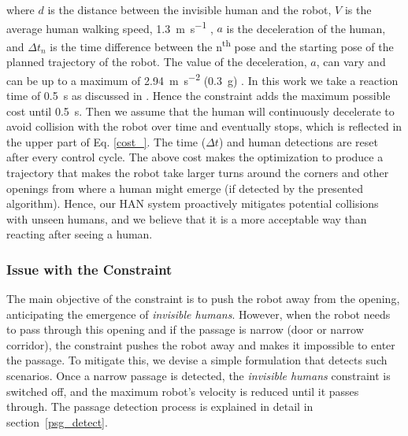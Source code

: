 where $d$ is the distance between the invisible human and the robot, $V$ is the average human walking speed, \SI[per-mode=symbol]{1.3}{\meter\per\second} \cite{phdthesis}, $a$ is the deceleration of the human, and $\Delta t_n$ is the time difference between the n\textsuperscript{th} pose and the starting pose of the planned trajectory of the robot. The value of the deceleration, $a$, can vary and can be up to a maximum of \SI{2.94}{\meter\per\second^2} (\SI{0.3}{\g}) \cite{lakoba2005modifications}. In this work we take a reaction time of \SI{0.5}{\second} as discussed in \cite{lakoba2005modifications, helbing2000simulating}. Hence the constraint adds the maximum possible cost until \SI{0.5}{\second}. Then we assume that the human will continuously decelerate to avoid collision with the robot over time and eventually stops, which is reflected in the upper part of Eq. \eqref{cost_}. The time ($\Delta t$) and human detections are reset after every control cycle. The above cost makes the optimization to produce a trajectory that makes the robot take larger turns around the corners and other openings from where a human might emerge (if detected by the presented algorithm). Hence, our HAN system proactively mitigates potential collisions with unseen humans, and we believe that it is a more acceptable way than reacting after seeing a human.  

\subsubsection{Issue with the Constraint}
The main objective of the constraint is to push the robot away from the opening, anticipating the emergence of \textit{invisible humans}. However, when the robot needs to pass through this opening and if the passage is narrow (door or narrow corridor), the constraint pushes the robot away and makes it impossible to enter the passage. To mitigate this, we devise a simple formulation that detects such scenarios. Once a narrow passage is detected, the \textit{invisible humans} constraint is switched off, and the maximum robot's velocity is reduced until it passes through. The passage detection process is explained in detail in section~\ref{psg_detect}.

